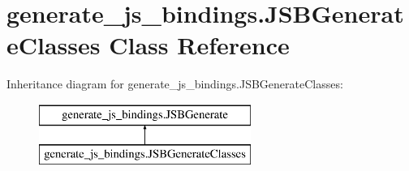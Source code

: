 \hypertarget{classgenerate__js__bindings_1_1_j_s_b_generate_classes}{\section{generate\-\_\-js\-\_\-bindings.\-J\-S\-B\-Generate\-Classes Class Reference}
\label{classgenerate__js__bindings_1_1_j_s_b_generate_classes}
}
Inheritance diagram for generate\-\_\-js\-\_\-bindings.\-J\-S\-B\-Generate\-Classes\-:\begin{figure}[H]
\begin{center}
\leavevmode
\includegraphics[height=2.000000cm]{classgenerate__js__bindings_1_1_j_s_b_generate_classes}
\end{center}
\end{figure}
